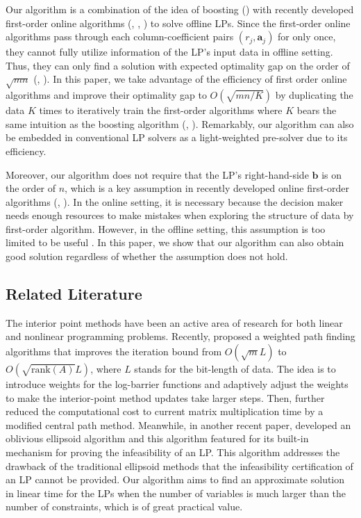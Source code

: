 \documentclass{article} %
\begin{document}
Our algorithm is a combination of the idea of boosting (\cite{shalev2014understanding}) with recently developed first-order online algorithms (\cite{li2020simple}, \cite{balseiro2020dual}, \cite{jiang2020online}) to solve offline LPs. Since the first-order online algorithms pass through each column-coefficient pairs $(r_j,\bm{a}_j)$ for only once, they cannot fully utilize information of the LP's input data in offline setting. Thus, they can only find a solution with expected optimality gap on the order of $\sqrt{mn}$ (\cite{li2020simple}, \cite{balseiro2020dual}). In this paper, we take advantage of the efficiency of first order online algorithms and improve their optimality gap to $O(\sqrt{mn/K})$ by duplicating the data $K$ times to iteratively train the first-order algorithms where $K$ bears the same intuition as the boosting algorithm (\cite{friedman2001elements}, \cite{shalev2014understanding}). Remarkably, our algorithm can also be embedded in conventional LP solvers as a light-weighted pre-solver due to its efficiency. 

Moreover, our algorithm does not require that the LP's right-hand-side $\bm{b}$ is on the order of $n$,  which is a key assumption in recently developed online first-order algorithms (\cite{li2020simple}, \cite{balseiro2020dual}). In the online setting, it is necessary because the decision maker needs enough resources to make mistakes when exploring the structure of data by first-order algorithm. However, in the offline setting, this assumption is too limited to be useful \citep{MIPLIB}.  In this paper, we show that our algorithm can also obtain good solution regardless of whether the assumption does not hold.



\subsection{Related Literature}
The interior point methods have been an active area of research for both linear and nonlinear programming problems. Recently, \cite{lee2014path} proposed a weighted path finding algorithms that improves the iteration bound from $O(\sqrt{m}L)$ to $O(\sqrt{\text{rank}(A)}L)$, where $L$ stands for the bit-length of data. The idea is to introduce weights for the log-barrier functions and adaptively adjust the weights to make the interior-point method updates take larger steps. Then, \cite{cohen2021solving} further reduced the computational cost to current matrix multiplication time by a modified central path method. Meanwhile, in another recent paper, \cite{lamperski2019oblivious} developed an oblivious ellipsoid algorithm and this algorithm featured for its built-in mechanism for proving the infeasibility of an LP. This algorithm addresses the drawback of the traditional ellipsoid methods that the infeasibility certification of an LP cannot be provided.  Our algorithm aims to find an approximate solution in linear time for the LPs when the number of variables is much larger than the number of constraints, which is of great practical value.
\end{document}
